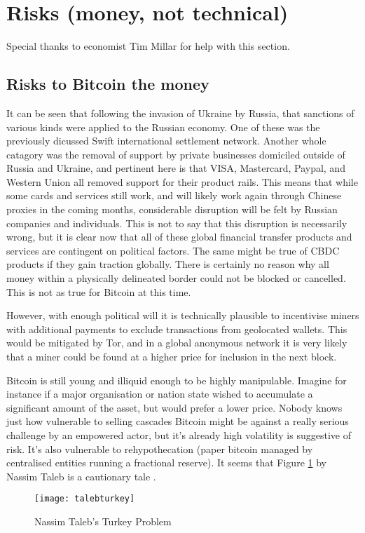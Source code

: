 \section{Risks (money, not technical)}
Special thanks to economist Tim Millar for help with this section.
\subsection{Risks to Bitcoin the money}
It can be seen that following the invasion of Ukraine by Russia, that sanctions of various kinds were applied to the Russian economy. One of these was the previously dicussed Swift international settlement network. Another whole catagory was the removal of support by private businesses domiciled outside of Russia and Ukraine, and pertinent here is that VISA, Mastercard, Paypal, and Western Union all removed support for their product rails. This means that while some cards and services still work, and will likely work again through Chinese proxies in the coming months, considerable disruption will be felt by Russian companies and individuals. This is not to say that this disruption is necessarily wrong, but it is clear now that all of these global financial transfer products and services are contingent on political factors. The same might be true of CBDC products if they gain traction globally. There is certainly no reason why all money within a physically delineated border could not be blocked or cancelled. This is not as true for Bitcoin at this time. \par 
However, with enough political will it is technically plausible to incentivise miners with additional payments to exclude transactions from geolocated wallets. This would be mitigated by Tor, and in a global anonymous network it is very likely that a miner could be found at a higher price for inclusion in the next block. \par
Bitcoin is still young and illiquid enough to be highly manipulable. Imagine for instance if a major organisation or nation state wished to accumulate a significant amount of the asset, but would prefer a lower price. %
Nobody knows just how vulnerable to selling cascades Bitcoin might be against a really serious challenge by an empowered actor, but it's already high volatility is suggestive of risk. It's also vulnerable to rehypothecation (paper bitcoin managed by centralised entities running a fractional reserve). It seems that Figure \ref{fig:talebturkey} by  Nassim Taleb is a cautionary tale \cite{taleb2012antifragile}.
\begin{figure}
  \centering
    \texttt{[image: talebturkey]}
  \caption{Nassim Taleb's Turkey Problem}
  \label{fig:talebturkey}
\end{figure}


